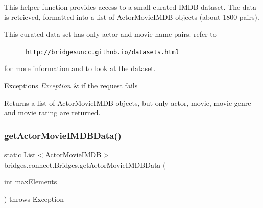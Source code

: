 This helper function provides access to a small curated I\+M\+DB dataset. The data is retrieved, formatted into a list of Actor\+Movie\+I\+M\+DB objects (about 1800 pairs).

This curated data set has only actor and movie name pairs. refer to 

~~~~~\href{http://bridgesuncc.github.io/datasets.html}{\texttt{ http\+://bridgesuncc.\+github.\+io/datasets.\+html}} 

for more information and to look at the dataset.


\begin{DoxyExceptions}{Exceptions}
{\em Exception} & if the request fails\\
\hline
\end{DoxyExceptions}
\begin{DoxyReturn}{Returns}
a list of Actor\+Movie\+I\+M\+DB objects, but only actor, movie, movie genre and movie rating are returned. 
\end{DoxyReturn}
\mbox{\label{classbridges_1_1connect_1_1_bridges_a76280ef69f0205e3711b18617e5c7646}} 
\subsubsection{\texorpdfstring{getActorMovieIMDBData()}{getActorMovieIMDBData()}\hspace{0.1cm}{\footnotesize\ttfamily [2/2]}}
{\footnotesize\ttfamily static List$<$\mbox{\hyperlink{classbridges_1_1data__src__dependent_1_1_actor_movie_i_m_d_b}{Actor\+Movie\+I\+M\+DB}}$>$ bridges.\+connect.\+Bridges.\+get\+Actor\+Movie\+I\+M\+D\+B\+Data (\begin{DoxyParamCaption}\item[{int}]{max\+Elements }\end{DoxyParamCaption}) throws Exception\hspace{0.3cm}{\ttfamily [static]}}

\mbox{\label{classbridges_1_1connect_1_1_bridges_a7a5f5efc6712ead5babe4cd21a4de3cc}} 
